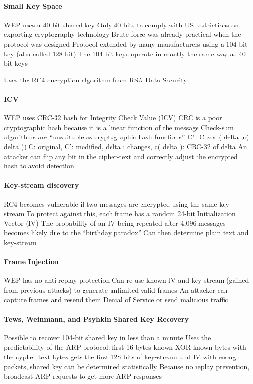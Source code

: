 \documentclass[pdftex, 12pt, a4paper]{article}
\begin{document}
\paragraph{Small Key Space}

WEP uses a 40-bit shared key
Only 40-bits to comply with US restrictions on exporting cryptography technology
Brute-force was already practical when the protocol was designed
Protocol extended by many manufacturers using a 104-bit key (also called 128-bit)
The 104-bit keys operate in exactly the same way as 40-bit keys

Uses the RC4 encryption algorithm from RSA Data Security

\paragraph{ICV}
WEP uses CRC-32 hash for Integrity Check Value (ICV)
CRC is a poor cryptographic hash because it is a linear function of the message
Check-sum algorithms are ``unsuitable as cryptographic hash functions''
C'=C xor ( delta ,c( delta ))
C: original, C': modified, delta : changes, c( delta ): CRC-32 of delta
An attacker can flip any bit in the
cipher-text and correctly adjust the encrypted hash to avoid detection

\paragraph{Key-stream discovery}
RC4 becomes vulnerable if two messages are encrypted using the same key-stream
To protect against this, each frame has a random 24-bit Initialization Vector (IV)
The probability of an IV being repeated after 4,096 messages becomes likely due to the ``birthday paradox''
Can then determine plain text and key-stream

\paragraph{Frame Injection}
WEP has no anti-replay protection
Can re-use known IV and key-stream (gained from previous attacks) to generate unlimited valid frames
An attacker can capture frames and resend them
Denial of Service or send malicious traffic

\paragraph{Tews, Weinmann, and Psyhkin Shared Key Recovery}
Possible to recover 104-bit shared key in less than a minute
Uses the predictability of the ARP protocol: first 16 bytes known
XOR known bytes with the cypher text bytes
gets the first 128 bits of key-stream and IV
with enough packets, shared key can be determined statistically
Because no replay prevention, broadcast ARP requests to get more ARP responses
\end{document}
